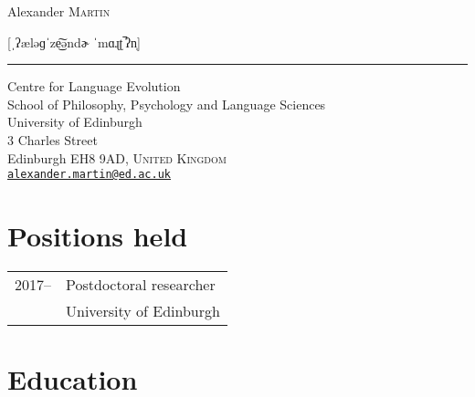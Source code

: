 \documentclass[a4paper, 10pt]{article}
\begin{document}

{\Huge{} Alexander \textsc{Martin}}

\smallskip
{\fontsize{19}{19}
[ˌʔæləɡˈze͜͠əndɚ ˈmɑɻʈ\,̚ʔn̩]}
\medskip
\hrule
\bigskip


\smallskip

Centre for Language Evolution\\
School of Philosophy, Psychology and Language Sciences \\ 
University of Edinburgh\\
3 Charles Street\\
Edinburgh EH8 9AD, \textsc{United Kingdom}\\
\href{mailto:alexander.martin@ed.ac.uk}{\texttt{alexander.martin@ed.ac.uk}}\\



\section*{Positions held}

\begin{tabular}{c|l}
2017-- & Postdoctoral researcher\\
& University of Edinburgh\\
\end{tabular}



\section*{Education}
\end{document}
